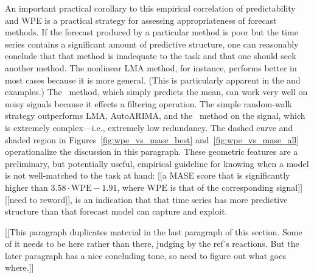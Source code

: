 
An important practical corollary to this empirical correlation of
predictability and WPE is a practical strategy for assessing
appropriateness of forecast methods.  If the forecast produced by a
particular method is poor but the time series contains a significant
amount of predictive structure, one can reasonably conclude that that
method is inadequate to the task and that one should seek another
method.  The nonlinear LMA method, for instance, performs better in
most cases because it is more general.  (This is particularly apparent
in the \col and \svdfive examples.)
The \naive ~method, which simply predicts the mean, can work very well
on noisy signals because it effects a filtering operation.  The simple
random-walk strategy outperforms LMA, AutoARIMA, and the \naive
~method on the \gcc signal, which is extremely complex---i.e.,
extremely low redundancy.
The dashed curve and shaded region in
Figures~\ref{fig:wpe_vs_mase_best} and~\ref{fig:wpe_vs_mase_all}
operationalize the discussion in this paragraph.  These geometric
features are a preliminary, but potentially useful, empirical
guideline for knowing when a model is not well-matched to the task at
hand: [[a MASE score that is significantly higher than $3.58 \cdot
    \mathrm{WPE} - 1.91$, where $\mathrm{WPE}$ is that of the
    corresponding signal]] [[need to reword]], is an indication that
that time series has more predictive structure than that forecast
model can capture and exploit.

[[This paragraph duplicates material in the last paragraph of this
    section.  Some of it needs to be here rather than there, judging
    by the ref's reactions.  But the later paragraph has a nice
    concluding tone, so need to figure out what goes where.]]

